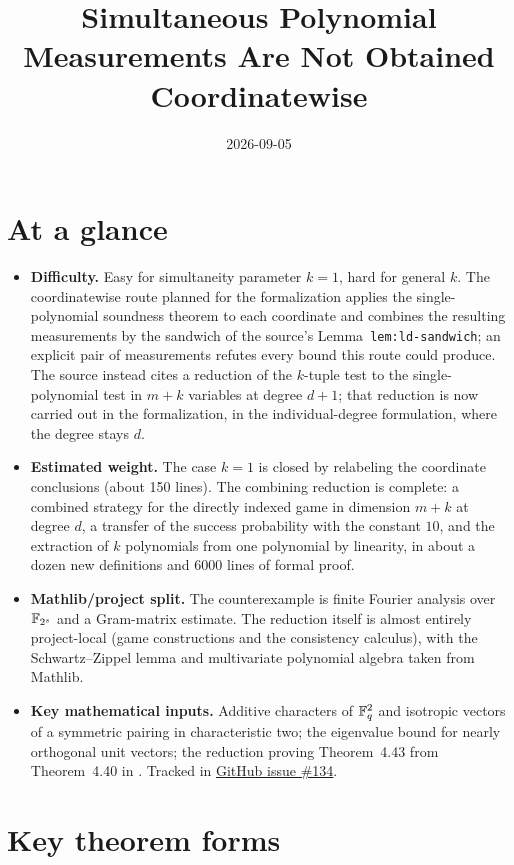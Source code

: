 \documentclass[11pt]{article}
\title{Simultaneous Polynomial Measurements Are Not Obtained Coordinatewise}
\author{}
\date{2026-09-05}
\renewcommand{\ghissue}[1]{%
  \href{https://github.com/Dengnifer/MIPStarRE-QPBT/issues/#1}{GitHub issue \##1}}
\begin{document}
\maketitle

\section{At a glance}

\begin{itemize}
  \item \textbf{Difficulty.} Easy for simultaneity parameter $k = 1$, hard
  for general $k$.  The coordinatewise route planned for the formalization
  applies the single-polynomial soundness theorem to each coordinate and
  combines the resulting measurements by the sandwich of the source's
  Lemma~\texttt{lem:ld-sandwich}; an explicit pair of measurements refutes
  every bound this route could produce.  The source instead cites a
  reduction of the $k$-tuple test to the single-polynomial test in $m + k$
  variables at degree $d + 1$; that reduction is now carried out in the
  formalization, in the individual-degree formulation, where the degree stays
  $d$.
  \item \textbf{Estimated weight.} The case $k = 1$ is closed by relabeling
  the coordinate conclusions (about 150 lines).  The combining reduction is
  complete: a combined strategy for the directly indexed game in dimension
  $m + k$ at degree $d$, a transfer of the success probability with the
  constant $10$, and the extraction of $k$ polynomials from one polynomial by
  linearity, in about a dozen new definitions and 6000 lines of formal proof.
  \item \textbf{Mathlib/project split.} The counterexample is finite Fourier
  analysis over $\mathbb{F}_{2^s}$ and a Gram-matrix estimate.  The reduction itself
  is almost entirely project-local (game constructions and the consistency
  calculus), with the Schwartz--Zippel lemma and multivariate polynomial
  algebra taken from Mathlib.
  \item \textbf{Key mathematical inputs.} Additive characters of $\mathbb{F}_q^2$
  and isotropic vectors of a symmetric pairing in characteristic two; the
  eigenvalue bound for nearly orthogonal unit vectors; the reduction proving
  Theorem~4.43 from Theorem~4.40 in \cite{Natarajan2018NEEXP}.  Tracked in
  \ghissue{134}.
\end{itemize}

\section{Key theorem forms}
\end{document}
